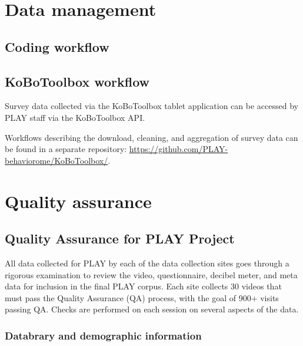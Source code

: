 \documentclass[
]{book}
\begin{document}
\hypertarget{data-management}{%
\chapter{Data management}\label{data-management}}

\hypertarget{coding-workflow}{%
\section{Coding workflow}\label{coding-workflow}}

\hypertarget{kobotoolbox-workflow}{%
\section{KoBoToolbox workflow}\label{kobotoolbox-workflow}}

Survey data collected via the KoBoToolbox tablet application can be accessed by PLAY staff via the KoBoToolbox API.

Workflows describing the download, cleaning, and aggregation of survey data can be found in a separate repository: \url{https://github.com/PLAY-behaviorome/KoBoToolbox/}.

\hypertarget{quality-assurance}{%
\chapter{Quality assurance}\label{quality-assurance}}

\hypertarget{quality-assurance-for-play-project}{%
\section{Quality Assurance for PLAY Project}\label{quality-assurance-for-play-project}}

All data collected for PLAY by each of the data collection sites goes through a rigorous examination to review the video, questionnaire, decibel meter, and meta data for inclusion in the final PLAY corpus. Each site collects 30 videos that must pass the Quality Assurance (QA) process, with the goal of 900+ visits passing QA. Checks are performed on each session on several aspects of the data.

\hypertarget{databrary-and-demographic-information}{%
\subsection{Databrary and demographic information}\label{databrary-and-demographic-information}}
\end{document}
